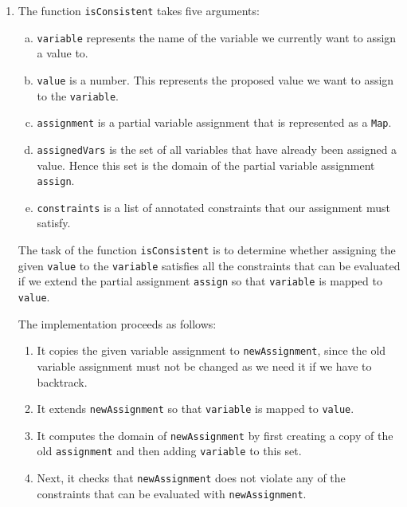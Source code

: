 \begin{enumerate}
  The implementation proceeds as follows:
  \begin{enumerate}
  \item It creates two lists \texttt{argNames} and \texttt{argValues}.  \texttt{argNames} is a list of the
    variable names, while \texttt{argValues} contains the corresponding values that are given in the variable
    assignment \texttt{assign}.
  \item It dynamically creates a new function \texttt{func} that returns the given expression \texttt{expr}.
  \item Finally, it calls this function with the corresponding arguments and returns the value computed by the
        dynamically created function.  This way, we can evaluate arbitrary expressions.
      \end{enumerate}
\item The function \texttt{isConsistent} takes five arguments:
  \begin{enumerate}[(a)]
  \item \texttt{variable} represents the name of the variable we currently want to assign a value to.
  \item \texttt{value} is a number. This represents the proposed value we want to assign to the \texttt{variable}.
  \item \texttt{assignment} is a partial variable assignment that is represented as a \texttt{Map}. 
  \item \texttt{assignedVars} is the set of all variables that have already been assigned a value.
        Hence this set is the domain of the partial variable assignment \texttt{assign}.
  \item \texttt{constraints} is a list of annotated constraints that our assignment must satisfy.
  \end{enumerate}
  The task of the function \texttt{isConsistent} is to determine whether assigning the given \texttt{value} to
  the \texttt{variable} satisfies all the constraints that can be evaluated if we extend the partial assignment
  \texttt{assign} so that \texttt{variable} is mapped to \texttt{value}.
  
  The implementation proceeds as follows:
  \begin{enumerate}
  \item It copies the given variable assignment to \texttt{newAssignment}, since the old variable assignment
        must not be changed as we need it if we have to backtrack.
  \item It extends \texttt{newAssignment} so that \texttt{variable} is mapped to \texttt{value}.
  \item It computes the domain of \texttt{newAssignment} by first creating a copy of the old
        \texttt{assignment} and then adding \texttt{variable} to this set.
  \item Next, it checks that \texttt{newAssignment} does not violate any of the constraints that can be
        evaluated with \texttt{newAssignment}.


\end{enumerate}
\end{enumerate}
